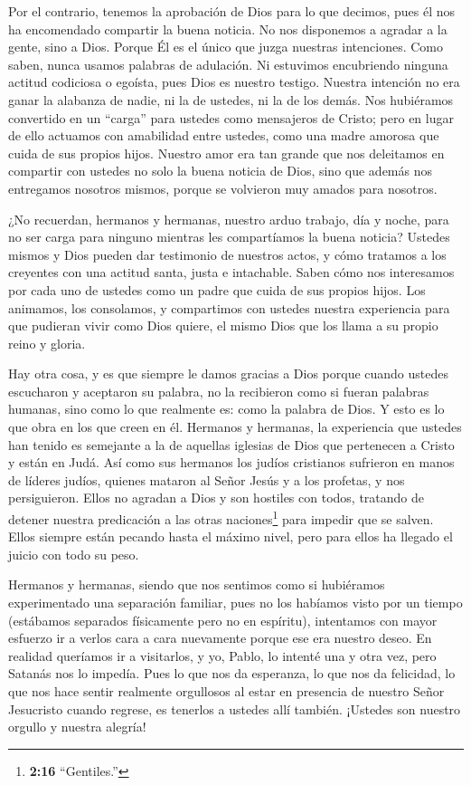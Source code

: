  Por el contrario, tenemos la aprobación de Dios para lo que
decimos, pues él nos ha encomendado compartir la buena noticia. No nos
disponemos a agradar a la gente, sino a Dios. Porque Él es el único que
juzga nuestras intenciones.  Como saben, nunca usamos
palabras de adulación. Ni estuvimos encubriendo ninguna actitud
codiciosa o egoísta, pues Dios es nuestro testigo.  Nuestra
intención no era ganar la alabanza de nadie, ni la de ustedes, ni la de
los demás. Nos hubiéramos convertido en un ``carga'' para ustedes como
mensajeros de Cristo;  pero en lugar de ello actuamos con
amabilidad entre ustedes, como una madre amorosa que cuida de sus
propios hijos.  Nuestro amor era tan grande que nos
deleitamos en compartir con ustedes no solo la buena noticia de Dios,
sino que además nos entregamos nosotros mismos, porque se volvieron muy
amados para nosotros.

 ¿No recuerdan, hermanos y hermanas, nuestro arduo trabajo,
día y noche, para no ser carga para ninguno mientras les compartíamos la
buena noticia?  Ustedes mismos y Dios pueden dar testimonio
de nuestros actos, y cómo tratamos a los creyentes con una actitud
santa, justa e intachable.  Saben cómo nos interesamos por
cada uno de ustedes como un padre que cuida de sus propios hijos. Los
animamos, los consolamos, y compartimos con ustedes nuestra experiencia
 para que pudieran vivir como Dios quiere, el mismo Dios
que los llama a su propio reino y gloria.

 Hay otra cosa, y es que siempre le damos gracias a Dios
porque cuando ustedes escucharon y aceptaron su palabra, no la
recibieron como si fueran palabras humanas, sino como lo que realmente
es: como la palabra de Dios. Y esto es lo que obra en los que creen en
él.  Hermanos y hermanas, la experiencia que ustedes han
tenido es semejante a la de aquellas iglesias de Dios que pertenecen a
Cristo y están en Judá. Así como sus hermanos los judíos cristianos
sufrieron en manos de líderes judíos,  quienes mataron al
Señor Jesús y a los profetas, y nos persiguieron. Ellos no agradan a
Dios y son hostiles con todos,  tratando de detener nuestra
predicación a las otras naciones\footnote{\textbf{2:16} ``Gentiles.''}
para impedir que se salven. Ellos siempre están pecando hasta el máximo
nivel, pero para ellos ha llegado el juicio con todo su peso.

 Hermanos y hermanas, siendo que nos sentimos como si
hubiéramos experimentado una separación familiar, pues no los habíamos
visto por un tiempo (estábamos separados físicamente pero no en
espíritu), intentamos con mayor esfuerzo ir a verlos cara a cara
nuevamente porque ese era nuestro deseo.  En realidad
queríamos ir a visitarlos, y yo, Pablo, lo intenté una y otra vez, pero
Satanás nos lo impedía.  Pues lo que nos da esperanza, lo
que nos da felicidad, lo que nos hace sentir realmente orgullosos al
estar en presencia de nuestro Señor Jesucristo cuando regrese, es
tenerlos a ustedes allí también.  ¡Ustedes son nuestro
orgullo y nuestra alegría!

